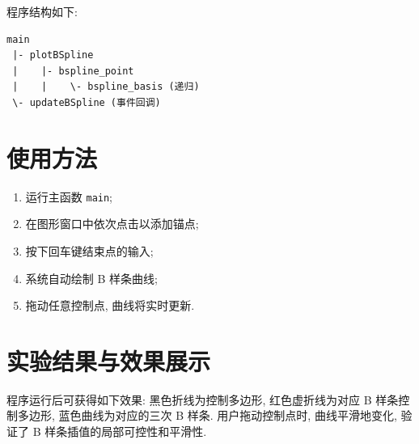 \documentclass[12pt,a4paper]{article}
\begin{document}
        程序结构如下:
        \begin{verbatim}
main
 |- plotBSpline
 |    |- bspline_point
 |    |    \- bspline_basis (递归)
 \- updateBSpline (事件回调)
        \end{verbatim}

    \section{使用方法}
        \begin{enumerate}
            \item 运行主函数 \texttt{main};
            \item 在图形窗口中依次点击以添加锚点;
            \item 按下回车键结束点的输入;
            \item 系统自动绘制 B 样条曲线;
            \item 拖动任意控制点, 曲线将实时更新.
        \end{enumerate}

    \section{实验结果与效果展示}
        程序运行后可获得如下效果: 黑色折线为控制多边形, 红色虚折线为对应 B 样条控制多边形, 蓝色曲线为对应的三次 B 样条. 用户拖动控制点时, 曲线平滑地变化, 验证了 B 样条插值的局部可控性和平滑性.
\end{document}
